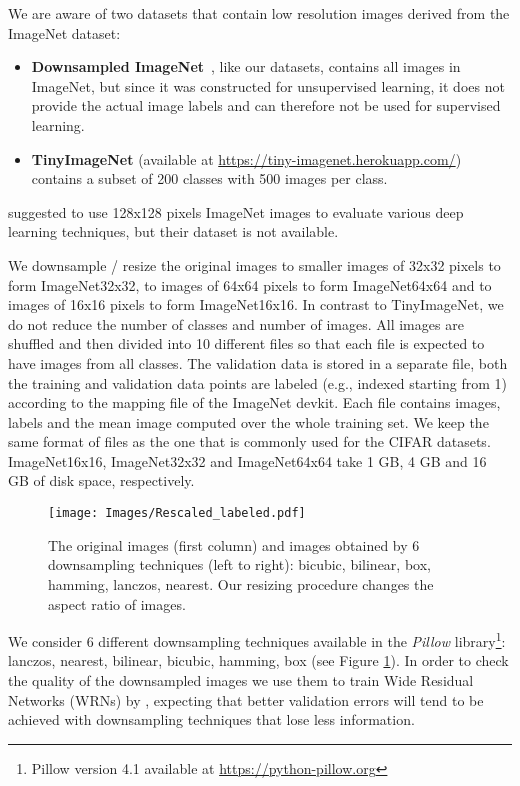 \documentclass{article} \usepackage{iclr2017_conference,times}
\begin{document}
We are aware of two datasets that contain low resolution images derived from the ImageNet dataset: 
\begin{itemize}
\item \textbf{Downsampled ImageNet}~\citep{oord2016pixel}, like our datasets, contains all images in ImageNet, but since it was constructed for unsupervised learning, it does not provide the actual image labels and can therefore not be used for supervised learning.
\item \textbf{TinyImageNet} (available at \url{https://tiny-imagenet.herokuapp.com/})
contains a subset of 200 classes with 500 images per class.
\end{itemize}

\cite{mishkin2016systematic} suggested to use 128x128 pixels  ImageNet images to evaluate various deep learning  techniques, but their dataset is not available. 

We downsample / resize the original images to smaller images of 32x32 pixels to form ImageNet32x32, to images of 64x64 pixels to form ImageNet64x64 and to images of 16x16 pixels to form ImageNet16x16. In contrast to TinyImageNet, we do not reduce the number of classes and number of images. All images are shuffled and then divided into 10 different files so that each file is expected to have images from all classes. The validation data is stored in a separate file, both the training and validation data points are labeled (e.g., indexed starting from 1) according to the mapping file of the  ImageNet devkit. Each file contains images, labels and the mean image computed over the whole training set. We keep the same format of files as the one that is commonly used for the CIFAR datasets. ImageNet16x16, ImageNet32x32 and ImageNet64x64 take 1 GB, 4 GB  and 16 GB of disk space, respectively.


\begin{figure}[b]
\begin{center}
\texttt{[image: Images/Rescaled\_labeled.pdf]}
\end{center}
\caption{The original images (first column) and images obtained by 6 downsampling techniques (left to right): bicubic, bilinear, box, hamming, lanczos, nearest. Our resizing procedure changes the aspect ratio of images.}
\label{Figure1}
\end{figure}

We consider 6 different downsampling techniques available in the \textit{Pillow} library\footnote{Pillow version 4.1 available at \url{https://python-pillow.org}}: lanczos, nearest, bilinear, bicubic, hamming, box (see Figure \ref{Figure1}). In order to check the quality of the downsampled images we use them to train Wide Residual Networks (WRNs) by \cite{zagoruyko2016wide}, expecting that better validation errors will tend to be achieved with downsampling techniques that lose less information.
\end{document}

